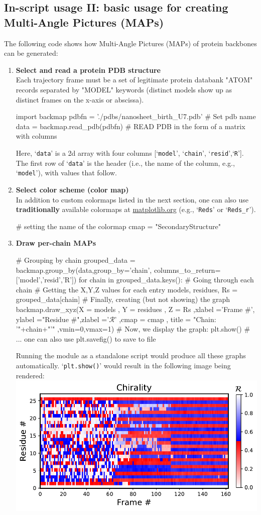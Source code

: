 \documentclass[fleqn,10pt,lineno]{wlpeerj} %
\def\ContinueLineNumber{\lstset{firstnumber=last}}
\newcommand{\n}[1]{{\textbf{\color{red}#1}}}
\newcommand{\code}[1]{\texttt{#1}\xspace}
\begin{document}
\subsection*{In-script usage II: basic usage for creating Multi-Angle Pictures (MAPs)}
The following code shows how Multi-Angle Pictures (MAPs) of protein backbones can be generated:
\begin{enumerate}
\item {\bf Select and read a protein PDB structure}\\
Each trajectory frame must be a set of legitimate protein databank "ATOM" records separated by "MODEL" keywords (distinct models show up as distinct frames on the x-axis or abscissa).
\begin{python}[firstnumber=1]
import backmap 
pdbfn = './pdbs/nanosheet_birth_U7.pdb' # Set pdb name 
data = backmap.read_pdb(pdbfn) # READ PDB in the form of a matrix with columns
\end{python}
Here, `\code{data}' is a 2d array with four columns [`\code{model}', `\code{chain}', `\code{resid}',`\code{R}']. 
The first row of `\code{data}' is the header (i.e., the name of the column, e.g., `\code{model}'), 
with values that follow.
\item {\bf Select color scheme (color map)}\\
In addition to custom colormaps listed in the next section, one can also use \n{traditionally} available colormaps at 
\href{http://matplotlib.org/examples/color/colormaps_reference.htm}{matplotlib.org} (e.g., `\code{Reds}' or `\code{Reds\_r}').
\ContinueLineNumber
\begin{python}
# setting the name of the colormap
cmap = "SecondaryStructure"
\end{python}
\item {\bf Draw per-chain MAPs}
\ContinueLineNumber
\begin{python}
# Grouping by chain
grouped_data = backmap.group_by(data,group_by='chain',
                            columns_to_return=['model','resid','R'])
for chain in grouped_data.keys(): # Going through each chain
	# Getting the X,Y,Z values for each entry
	models, residues, Rs = grouped_data[chain]
	# Finally, creating (but not showing) the graph 
	backmap.draw_xyz(X = models  ,      Y = residues  ,     Z = Rs
	           ,xlabel ='Frame #', ylabel ="Residue #",zlabel ='$\mathcal{R}$'
	             ,cmap = cmap    ,  title = "Chain: '"+chain+"'"
	             ,vmin=0,vmax=1)
	# Now, we display the graph:
	plt.show() # ... one can also use plt.savefig() to save to file
\end{python}
Running the module as a standalone script would produce all these graphs automatically.
`\code{plt.show()}' would result in the following image being rendered:\\
\includegraphics[width=0.5\linewidth]{backmap_figA.pdf}


\end{enumerate}
\end{document}
